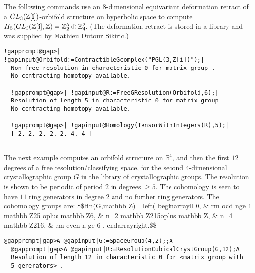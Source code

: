 \documentclass[a4paper,11pt]{report}
\begin{document}
{{ The following commands use an $8$-dimensional equivariant deformation retract of a $GL_3(\mathbb Z[{\bf i}])$-orbifold structure on hyperbolic space to compute $H_5(GL_3({\mathbb Z}[{\bf i}],\mathbb Z) = \mathbb Z_2^5\oplus \mathbb Z_4^2$. (The deformation retract is stored in a library and was supplied by Mathieu
Dutour Sikiric.) 
\begin{Verbatim}[commandchars=!@|,fontsize=\small,frame=single,label=Example]
  !gapprompt@gap>| !gapinput@Orbifold:=ContractibleGcomplex("PGL(3,Z[i])");|
  Non-free resolution in characteristic 0 for matrix group . 
  No contracting homotopy available. 
  
  !gapprompt@gap>| !gapinput@R:=FreeGResolution(Orbifold,6);|
  Resolution of length 5 in characteristic 0 for matrix group . 
  No contracting homotopy available. 
  
  !gapprompt@gap>| !gapinput@Homology(TensorWithIntegers(R),5);|
  [ 2, 2, 2, 2, 2, 4, 4 ]
  
\end{Verbatim}
 The next example computes an orbifold structure on $\mathbb R^4$, and then the first $12$ degrees of a free resolution/classifying space, for the second $4$-dimensional crystallographic group $G$ in the library of crystallographic groups. The resolution is shown to be
periodic of period $2$ in degrees $\ge 5$. The cohomology is seen to have $11$ ring generators in degree $2$ and no further ring generators. The cohomology groups are:
\$\$H\texttt{}n(G,\texttt{}mathbb Z)
=\texttt{}left(
\texttt{}begin\texttt{}array\texttt{}\texttt{}ll\texttt{}
0, \& \texttt{}\texttt{}rm
odd\texttt{}\texttt{} n\texttt{}ge
1\texttt{}\texttt{} \texttt{}mathbb
Z{\textunderscore}2\texttt{}5 \texttt{}oplus
\texttt{}mathbb Z\texttt{}6, \&
n=2\texttt{}\texttt{} \texttt{}mathbb
Z{\textunderscore}2\texttt{}\texttt{}15\texttt{}\texttt{}oplus
\texttt{}mathbb Z, \& n=4\texttt{}\texttt{}
\texttt{}mathbb
Z{\textunderscore}2\texttt{}\texttt{}16\texttt{},
\& \texttt{}\texttt{}rm
even\texttt{}\texttt{} n \texttt{}ge 6
.\texttt{}\texttt{}
\texttt{}end\texttt{}array\texttt{}\texttt{}right.\$\$ 
\begin{Verbatim}[commandchars=@|A,fontsize=\small,frame=single,label=Example]
  @gapprompt|gap>A @gapinput|G:=SpaceGroup(4,2);;A
  @gapprompt|gap>A @gapinput|R:=ResolutionCubicalCrystGroup(G,12);A
  Resolution of length 12 in characteristic 0 for <matrix group with 
  5 generators> . 
  

\end{Verbatim}}}
\end{document}
